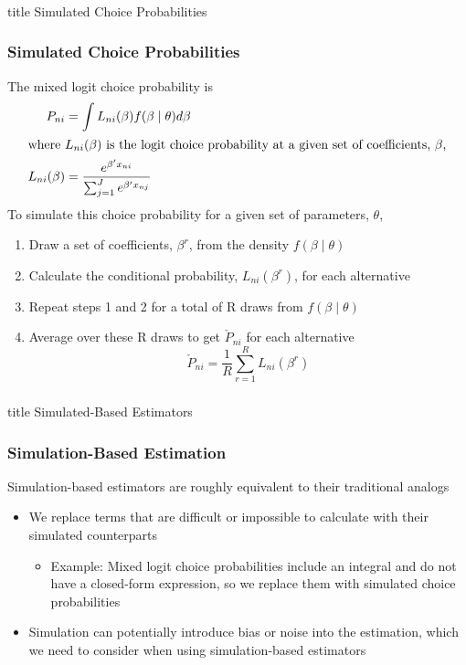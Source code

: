 \documentclass{beamer}
\begin{document}
\begin{frame}\frametitle{}
    \vfill
    \centering
    \begin{beamercolorbox}[center]{title}
        \Large Simulated Choice Probabilities
    \end{beamercolorbox}
    \vfill
\end{frame}

\begin{frame}\frametitle{Simulated Choice Probabilities}
    The mixed logit choice probability is
    \begin{align*}
        P_{ni} &= \int L_{ni}(\beta) f(\beta \mid \theta) d \beta \\
        \intertext{where $L_{ni}(\beta)$ is the logit choice probability at a given set of coefficients, $\beta$,}
        L_{ni}(\beta) &= \frac{e^{\beta' x_{ni}}}{\sum_{j = 1}^J e^{\beta' x_{nj}}}
    \end{align*}
    To simulate this choice probability for a given set of parameters, $\theta$,
    \begin{enumerate}
        \item Draw a set of coefficients, $\beta^r$, from the density $f(\beta \mid \theta)$
        \item Calculate the conditional probability, $L_{ni}(\beta^r)$, for each alternative
        \item Repeat steps 1 and 2 for a total of R draws from $f(\beta \mid \theta)$
        \item Average over these R draws to get $\check{P}_{ni}$ for each alternative
        $$\check{P}_{ni} = \frac{1}{R} \sum_{r = 1}^R L_{ni}(\beta^r)$$
    \end{enumerate}
\end{frame}

\begin{frame}\frametitle{}
    \vfill
    \centering
    \begin{beamercolorbox}[center]{title}
        \Large Simulated-Based Estimators
    \end{beamercolorbox}
    \vfill
\end{frame}

\begin{frame}\frametitle{Simulation-Based Estimation}
    Simulation-based estimators are roughly equivalent to their traditional analogs
    \begin{itemize}
        \item We replace terms that are difficult or impossible to calculate with their simulated counterparts
        \begin{itemize}
            \item Example: Mixed logit choice probabilities include an integral and do not have a closed-form expression, so we replace them with simulated choice probabilities
        \end{itemize}
        \item Simulation can potentially introduce bias or noise into the estimation, which we need to consider when using simulation-based estimators
    \end{itemize}
\end{frame}
\end{document}
